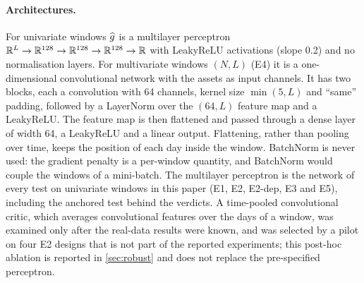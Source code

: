 \paragraph{Architectures.}
For univariate windows $\widehat{g}$ is a multilayer perceptron $\mathbb{R}^L\to\mathbb{R}^{128}\to\mathbb{R}^{128}\to\mathbb{R}^{128}\to\mathbb{R}$
with LeakyReLU activations (slope 0.2) and no normalisation layers. For multivariate windows
$(N,L)$ (E4) it is a one-dimensional convolutional network with the assets as input channels.
It has two blocks, each a convolution with 64 channels, kernel size $\min(5,L)$ and ``same''
padding, followed by a LayerNorm over the $(64,L)$ feature map and a LeakyReLU. The feature map
is then flattened and passed through a dense layer of width 64, a LeakyReLU and a linear
output. Flattening, rather than pooling over time, keeps the position of each day inside the
window. BatchNorm is never used: the gradient penalty is a per-window quantity, and BatchNorm
would couple the windows of a mini-batch. The multilayer perceptron is the network of every
test on univariate windows in this paper (E1, E2, E2-dep, E3 and E5), including the anchored test
behind the verdicts. A time-pooled convolutional critic, which averages convolutional features
over the days of a window, was examined only after the real-data results were known, and was
selected by a pilot on four E2 designs that is not part of the reported experiments; this
post-hoc ablation is reported in \cref{sec:robust} and does not replace the pre-specified
perceptron.

